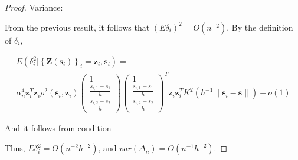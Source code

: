 \documentclass[english]{article}\usepackage[]{graphicx}\usepackage[]{color}
\theoremstyle{plain}
\theoremstyle{plain}
\begin{document}
\begin{proof}
Variance:

From the previous result, it follows that $\left(E\delta_{i}\right)^{2}=O\left(n^{-2}\right)$.
By the definition of $\delta_{i}$,

\begin{multline*}
E\left(\delta_{i}^{2}|\left\{ \bm{Z}\left(\bm{s}_{i}\right)\right\} _{i}=\bm{z}_{i},\bm{s}_{i}\right)=\\
\alpha_{n}^{4}\bm{z}_{i}^{T}\bm{z}_{i}\rho^{2}\left(\bm{s}_{i},\bm{z}_{i}\right)\left(\begin{array}{c}
1\\
\frac{s_{i,1}-s_{1}}{h}\\
\frac{s_{i,2}-s_{2}}{h}
\end{array}\right)\left(\begin{array}{c}
1\\
\frac{s_{i,1}-s_{1}}{h}\\
\frac{s_{i,2}-s_{2}}{h}
\end{array}\right)^{T}\bm{z}_{i}\bm{z}_{i}^{T}K^{2}\left(h^{-1}\|\bm{s}_{i}-\bm{s}\|\right)+o\left(1\right)
\end{multline*}


And it follows from condition

Thus, $E\delta_{i}^{2}=O\left(n^{-2}h^{-2}\right)$, and $var\left(\Delta_{n}\right)=O\left(n^{-1}h^{-2}\right)$.
\end{proof}


\end{document}
